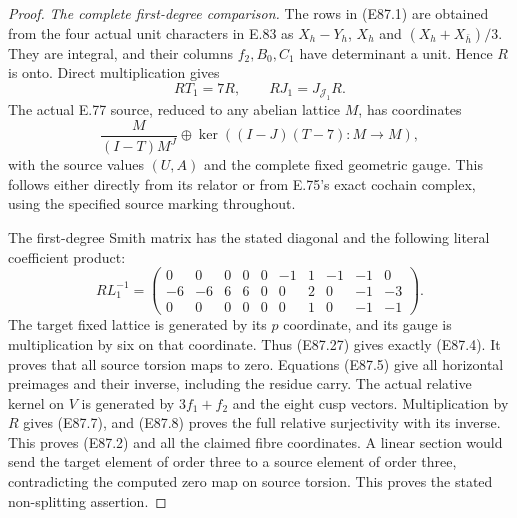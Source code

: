 \begin{proof}
\emph{The complete first-degree comparison.}
The rows in (E87.1) are obtained from the four
actual unit characters in E.83 as
$X_h-Y_h$, $X_h$ and $(X_h+X_{\bar h})/3$.
They are integral, and their columns $f_2,B_0,C_1$
have determinant a unit. Hence $R$ is onto.
Direct multiplication gives
\[
          RT_1=7R,\qquad RJ_1=J_{\mathcal J_1}R.
 \tag{E87.25}
\]
The actual E.77 source, reduced to any abelian
lattice $M$, has coordinates
\[
 \frac{M}{(I-T)M^J}\oplus
          \ker((I-J)(T-7):M\to M),
 \tag{E87.26}
\]
with the source values $(U,A)$ and the complete
fixed geometric gauge. This follows either
directly from its relator or from E.75's exact
cochain complex, using the specified source
marking throughout.

The first-degree Smith matrix has the stated
diagonal and the following literal coefficient
product:
\[
 RL_1^{-1}=\begin{pmatrix}
 0&0&0&0&0&-1&1&-1&-1&0\\
 -6&-6&6&6&0&0&2&0&-1&-3\\
 0&0&0&0&0&0&1&0&-1&-1
 \end{pmatrix}.
 \tag{E87.27}
\]
The target fixed lattice is generated by its
$p$ coordinate, and its gauge is multiplication
by six on that coordinate. Thus (E87.27) gives
exactly (E87.4). It proves that all source torsion
maps to zero. Equations (E87.5) give all
horizontal preimages and their inverse, including
the residue carry. The actual relative kernel
on $V$ is generated by $3f_1+f_2$ and the eight
cusp vectors. Multiplication by $R$ gives
(E87.7), and (E87.8) proves the full relative
surjectivity with its inverse. This proves
(E87.2) and all the claimed fibre coordinates.
A linear section would send the target element
of order three to a source element of order
three, contradicting the computed zero map
on source torsion. This proves the stated
non-splitting assertion.


\end{proof}

